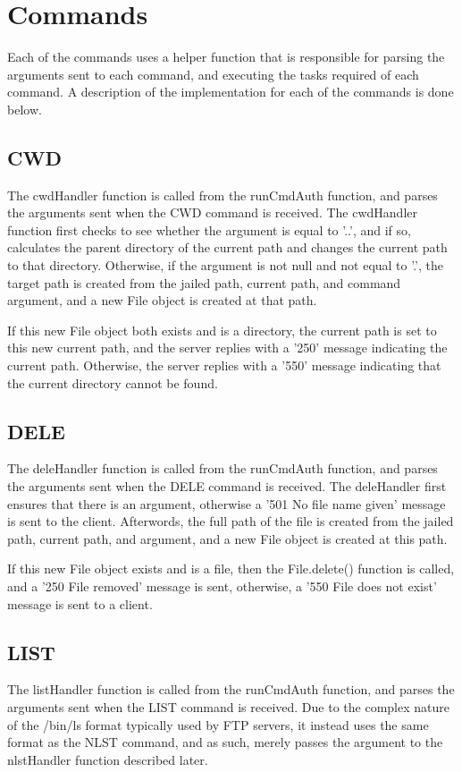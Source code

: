 \documentclass[11pt,a4paper,titlepage]{article}
\begin{document}
\section{Commands}
Each of the commands uses a helper function that is responsible for parsing the arguments sent to each command, and executing the tasks required of each command. A description of the implementation for each of the commands is done below.

\subsection{CWD}
The cwdHandler function is called from the runCmdAuth function, and parses the arguments sent when the CWD command is received. The cwdHandler function first checks to see whether the argument is equal to '..', and if so, calculates the parent directory of the current path and changes the current path to that directory. Otherwise, if the argument is not null and not equal to '.', the target path is created from the jailed path, current path, and command argument, and a new File object is created at that path.

If this new File object both exists and is a directory, the current path is set to this new current path, and the server replies with a '250' message indicating the current path. Otherwise, the server replies with a '550' message indicating that the current directory cannot be found.

\subsection{DELE}
The deleHandler function is called from the runCmdAuth function, and parses the arguments sent when the DELE command is received. The deleHandler first ensures that there is an argument, otherwise a '501 No file name given' message is sent to the client. Afterwords, the full path of the file is created from the jailed path, current path, and argument, and a new File object is created at this path.

If this new File object exists and is a file, then the File.delete() function is called, and a '250 File removed' message is sent, otherwise, a '550 File does not exist' message is sent to a client.

\subsection{LIST}
The listHandler function is called from the runCmdAuth function, and parses the arguments sent when the LIST command is received. Due to the complex nature of the /bin/ls format typically used by FTP servers, it instead uses the same format as the NLST command, and as such, merely passes the argument to the nlstHandler function described later.
\end{document}
